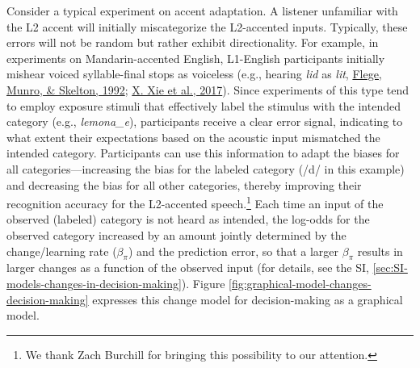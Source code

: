 \documentclass[
  11pt,
  english,
  man,floatsintext]{apa6}
\begin{document}
Consider a typical experiment on accent adaptation. A listener unfamiliar with the L2 accent will initially miscategorize the L2-accented inputs. Typically, these errors will not be random but rather exhibit directionality. For example, in experiments on Mandarin-accented English, L1-English participants initially mishear voiced syllable-final stops as voiceless (e.g., hearing \emph{lid} as \emph{lit}, \protect\hyperlink{ref-flege1992}{Flege, Munro, \& Skelton, 1992}; \protect\hyperlink{ref-xie2016jep}{X. Xie et al., 2017}). Since experiments of this type tend to employ exposure stimuli that effectively label the stimulus with the intended category (e.g., \emph{lemona\_e}), participants receive a clear error signal, indicating to what extent their expectations based on the acoustic input mismatched the intended category. Participants can use this information to adapt the biases for all categories---increasing the bias for the labeled category (/d/ in this example) and decreasing the bias for all other categories, thereby improving their recognition accuracy for the L2-accented speech.\footnote{We thank Zach Burchill for bringing this possibility to our attention.} Each time an input of the observed (labeled) category is not heard as intended, the log-odds for the observed category increased by an amount jointly determined by the change/learning rate (\(\beta_{\pi}\)) and the prediction error, so that a larger \(\beta_{\pi}\) results in larger changes as a function of the observed input (for details, see the SI, \ref{sec:SI-models-changes-in-decision-making}). Figure \ref{fig:graphical-model-changes-decision-making} expresses this change model for decision-making as a graphical model.
\end{document}
